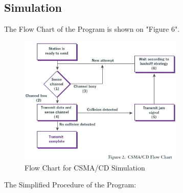 \documentclass[11pt,a4paper]{report}
\begin{document}
\subsection*{Simulation}
The Flow Chart of the Program is shown on "Figure 6". \\
\begin{figure}
\centering
\includegraphics[width=0.7\textwidth]{4_1.eps}
\caption{Flow Chart for CSMA/CD Simulation}
\end{figure}

The Simplified Procedure of the Program: \\
\end{document}
